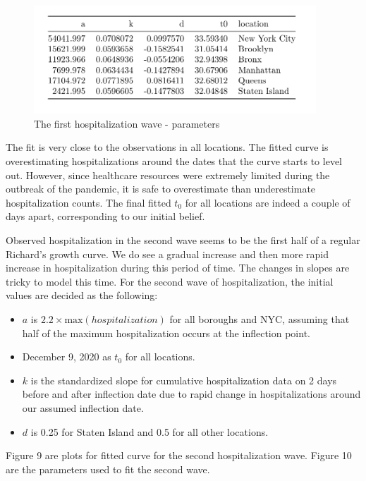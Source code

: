 \documentclass[
]{article}
\providecommand{\tightlist}{%
  \setlength{\itemsep}{0pt}\setlength{\parskip}{0pt}}
\begin{document}
\begin{figure}
\centering
\includegraphics[width=4.16667in,height=\textheight]{plots/hosp_plots/no_start_curve/hosp_wave1_final_parameters.png}
\caption{The first hospitalization wave - parameters}
\end{figure}

The fit is very close to the observations in all locations. The fitted
curve is overestimating hospitalizations around the dates that the curve
starts to level out. However, since healthcare resources were extremely
limited during the outbreak of the pandemic, it is safe to overestimate
than underestimate hospitalization counts. The final fitted \(t_0\) for
all locations are indeed a couple of days apart, corresponding to our
initial belief.

Observed hospitalization in the second wave seems to be the first half
of a regular Richard's growth curve. We do see a gradual increase and
then more rapid increase in hospitalization during this period of time.
The changes in slopes are tricky to model this time. For the second wave
of hospitalization, the initial values are decided as the following:

\begin{itemize}
\tightlist
\item
  \(a\) is \(2.2 \times \mbox{max}(hospitalization)\) for all boroughs
  and NYC, assuming that half of the maximum hospitalization occurs at
  the inflection point.
\item
  December 9, 2020 as \(t_0\) for all locations.
\item
  \(k\) is the standardized slope for cumulative hospitalization data on
  2 days before and after inflection date due to rapid change in
  hospitalizations around our assumed inflection date.
\item
  \(d\) is 0.25 for Staten Island and 0.5 for all other locations.
\end{itemize}

Figure 9 are plots for fitted curve for the second hospitalization wave.
Figure 10 are the parameters used to fit the second wave.
\end{document}
